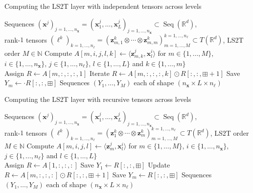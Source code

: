 \documentclass{article} \usepackage{iclr2021_conference,times}
\newcommand{\R}{\mathbb{R}}
\newcommand{\bx}{\mathbf{x}}
\newcommand{\bz}{\mathbf{z}}
\newcommand{\NN}{\mathbb{N}}
\newcommand{\Seq}[1]{\operatorname{Seq}(#1)}
\theoremstyle{plain}
\theoremstyle{definition}
\begin{document}
  \begin{algorithm}[t]
	\caption{Computing the LS2T layer with independent tensors across levels}
	\label{alg:ls2t_independent}
	\begin{algorithmic}[1]
		 Sequences $(\bx^j)_{j=1,\dots,n_\bx} = (\bx^j_1, \dots, \bx^j_{L})_{j=1,\dots,n_\bx} \subset \Seq{\R^d}$, \\
		rank-$1$ tensors $(\ell^k)_{k=1,\dots,n_\ell} = (\bz^k_{m,1} \otimes \cdots \otimes \bz^k_{m,m})^{k=1,\dots,n_\ell}_{m=1,\dots,M} \subset T(\R^d)$, LS2T order $M \in \NN$ 
		\STATE Compute $A[m, i, j, l, k] \gets \langle \bz^j_{m, k}, \bx^i_{l} \rangle$ for $m \in \{1,\dots,M\}$, $i \in \{1,\dots,n_\bx\}$, $j \in \{1,\dots,n_\ell\}$, $l \in \{1, \dots, L\}$ and $k \in \{1, \dots, m\}$ \\
		\STATE Assign $R \gets A[m, :, :, :, 1]$
		\STATE Iterate $R \gets A[m, :, :, :, k] \odot R[:, :, \boxplus+1]$ \label{algline:alg1_cumsum1}
		\ENDFOR
		\STATE Save $Y_m \gets \cdot R[:, :, \boxplus]$ \label{algline:alg1_cumsum2}
		\ENDFOR
		 Sequences $(Y_1, \dots, Y_M)$ each of shape $(n_\bx \times L \times n_\ell)$
	\end{algorithmic}
\end{algorithm}

\begin{algorithm}[t]
	\caption{Computing the LS2T layer with recursive tensors across levels}
	\label{alg:ls2t_recursive}
	\begin{algorithmic}[1]
		 Sequences $(\bx^j)_{j=1,\dots,n_\bx} = (\bx^j_1, \dots, \bx^j_{L})_{j=1,\dots,n_\bx} \subset \Seq{\R^d}$, \\
		rank-$1$ tensors $(\ell^k)_{k=1,\dots,n_\ell} = (\bz^k_{1} \otimes \cdots \otimes \bz^k_{m})^{k=1,\dots,n_\ell}_{m=1,\dots,M} \subset T(\R^d)$, LS2T order $M \in \NN$ 
		\STATE Compute $A[m, i, j, l] \gets \langle \bz^j_{m}, \bx^i_{l} \rangle$ for $m \in \{1,\dots,M\}$, $i \in \{1,\dots,n_\bx\}$, $j \in \{1,\dots,n_\ell\}$ and $l \in \{1, \dots, L\}$ \\
		\STATE Assign $R \gets A[1, :, :, :]$
		\STATE Save $Y_1 \gets R[:, :, \boxplus]$ \label{algline:alg2_cumsum1}
		\STATE Update $R \gets A[m, :, :, :] \odot R[:, :, \boxplus+1]$ \label{algline:alg2_cumsum2}
		\STATE Save $Y_m \gets R[:, :, \boxplus]$
		\ENDFOR
		 Sequences $(Y_1, \dots, Y_M)$ each of shape $(n_\bx \times L \times n_\ell)$
	\end{algorithmic}
\end{algorithm}
\end{document}
